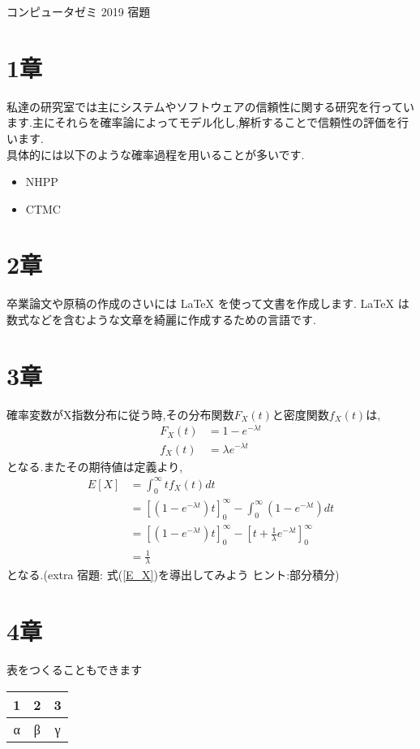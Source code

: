 \documentclass[a4paper,12pt]{article}
\begin{document}
\begin{center}
{\large コンピュータゼミ 2019 宿題}
\end{center}

\section{1章}
私達の研究室では主にシステムやソフトウェアの信頼性に関する研究を行っています.主にそれらを確率論によってモデル化し,解析することで信頼性の評価を行います.\\

具体的には以下のような確率過程を用いることが多いです.\\
\begin{itemize}
\vspace{-4mm}
\item NHPP\\
\vspace{-6mm}
\item CTMC\\
\end{itemize}
\section{2章}
卒業論文や原稿の作成のさいには \LaTeX
を使って文書を作成します. \LaTeX
は数式などを含むような文章を綺麗に作成するための言語です.\\
\section{3章}
確率変数がX指数分布に従う時,その分布関数$F_X(t)$と密度関数$f_X(t)$は,\\

\begin{align}
F_X(t)  &=  1-e^{-\lambda t} \label{F_X} \\
f_X(t)  &=  \lambda e^{-\lambda t}\label{f_X}
\end{align}
となる.またその期待値は定義より,\\

\begin{align}
E[X] &= \int_0^{\infty} tf_X(t)dt\nonumber\\
    &= [(1-e^{-\lambda t})t]_0^{\infty}-\int_0^{\infty} (1-e^{-\lambda t})dt\nonumber\\
     &= [(1-e^{-\lambda t})t]_0^{\infty}-[t+\frac{1}{\lambda}e^{-\lambda t} ]_0^{\infty}\nonumber\\
     &=\frac{1}{\lambda}\label{E_X}
\end{align}
となる.(extra 宿題: 式(\ref{E_X})を導出してみよう ヒント:部分積分)\\
\section{4章}
表をつくることもできます
\begin{center}
\begin{tabular}{|c|c|c|}\hline
 1 & 2 & 3 \\\hline
 α & β & γ\\\hline
\end{tabular}
\end{center}
\end{document}
